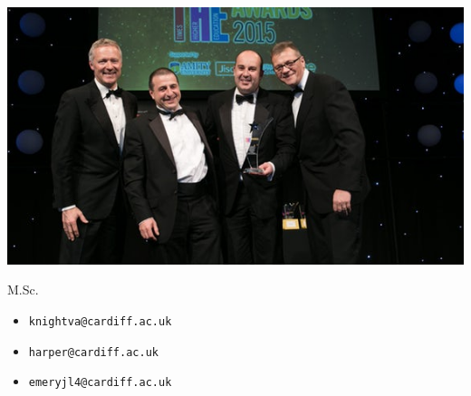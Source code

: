 \documentclass{beamer}
\begin{document}
	\begin{frame}
		\begin{center}
			\includegraphics[width=.8\textwidth]{./img/the-awards.jpg}
		\end{center}
	\end{frame}

	\begin{frame}
		\begin{center}
			\Huge
			M.Sc.
		\end{center}
	\end{frame}

    \begin{frame}
        \Large
        \begin{itemize}
            \item \texttt{knightva@cardiff.ac.uk}
            \item \texttt{harper@cardiff.ac.uk}
            \item \texttt{emeryjl4@cardiff.ac.uk}
        \end{itemize}
    \end{frame}
\end{document}
